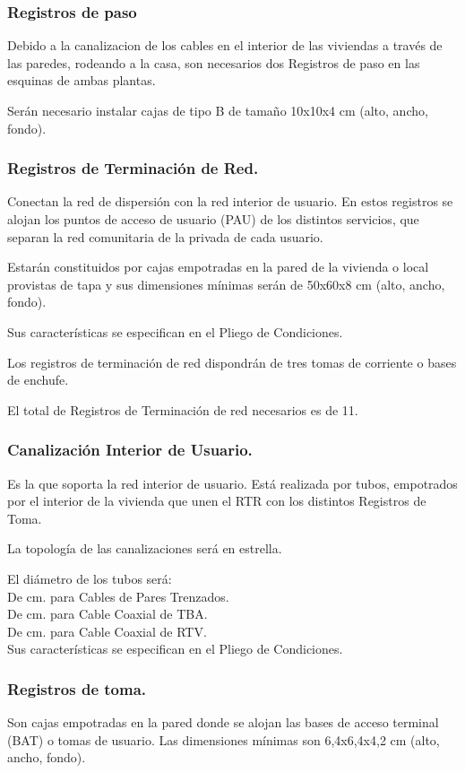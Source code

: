 \subsubsection*{Registros de paso}
Debido a la canalizacion de los cables en el interior de las viviendas a través de las paredes, rodeando a la casa, son necesarios dos Registros de paso en las esquinas de ambas plantas.

Serán necesario instalar cajas de tipo B de tamaño 10x10x4 cm (alto, ancho, fondo).

\subsubsection{Registros de Terminación de Red.}
Conectan la red de dispersión con la red interior de usuario. En estos registros se alojan los puntos de acceso de usuario (PAU) de los distintos servicios, que separan la red comunitaria de la privada de cada usuario.

Estarán constituidos por cajas empotradas en la pared de la vivienda o local provistas de tapa y sus dimensiones mínimas serán de 50x60x8 cm (alto, ancho, fondo).

Sus características se especifican en el Pliego de Condiciones.

Los registros de terminación de red dispondrán de tres tomas de corriente o bases de enchufe.

El total de Registros de Terminación de red necesarios es de 11.

\subsubsection{Canalización Interior de Usuario.}
Es la que soporta la red interior de usuario. Está realizada por tubos, empotrados por el interior de la vivienda que unen el RTR con los distintos Registros de Toma.

La topología de las canalizaciones será en estrella.

El diámetro de los tubos será:\\
De  cm. para Cables de Pares Trenzados.\\
De  cm. para Cable Coaxial de TBA. \\
De  cm. para Cable Coaxial de RTV. \\

Sus características se especifican en el Pliego de Condiciones.

\subsubsection{Registros de toma.}
Son cajas empotradas en la pared donde se alojan las bases de acceso terminal (BAT) o tomas de usuario. Las dimensiones mínimas son 6,4x6,4x4,2 cm (alto, ancho, fondo).

